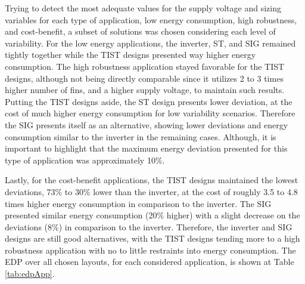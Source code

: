 \documentclass[diss,pgmicro,english]{iiufrgs}
\begin{document}
Trying to detect the most adequate values for the supply voltage and sizing variables for each type of application, low energy consumption, high robustness, and cost-benefit, a subset of solutions was chosen considering each level of variability. For the low energy applications, the inverter, ST, and SIG remained tightly together while the TIST designs presented way higher energy consumption. The high robustness application stayed favorable for the TIST designs, although not being directly comparable since it utilizes 2 to 3 times higher number of fins, and a higher supply voltage, to maintain such results. Putting the TIST designs aside, the ST design presents lower deviation, at the cost of much higher energy consumption for low variability scenarios. Therefore the SIG presents itself as an alternative, showing lower deviations and energy consumption similar to the inverter in the remaining cases. Although, it is important to highlight that the maximum energy deviation presented for this type of application was approximately 10\%.

Lastly, for the cost-benefit applications, the TIST designs maintained the lowest deviations, 73\% to 30\% lower than the inverter, at the cost of roughly 3.5 to 4.8 times higher energy consumption in comparison to the inverter. The SIG presented similar energy consumption (20\% higher) with a slight decrease on the deviations (8\%) in comparison to the inverter. Therefore, the inverter and SIG designs are still good alternatives, with the TIST designs tending more to a high robustness application with no to little restraints into energy consumption. The EDP over all chosen layouts, for each considered application, is shown at Table \ref{tab:edpApp}.

\begin{table}[]
\centering
\caption{EDP for each chosen design for the considered applications.}
\label{tab:edpApp}
\end{table}
\end{document}
